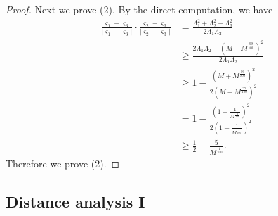 \documentclass[reqno]{amsart}
\theoremstyle{plain}
\theoremstyle{definition}
\numberwithin{equation}{section}
\newcommand{\1}{\mathbbm{1}}
\begin{document}
\begin{proof}
Next we prove (2). By the direct computation, we have
\begin{align*}
\frac{\varsigma_1-\varsigma_3}{|\varsigma_1-\varsigma_3|}\cdot \frac{\varsigma_2-\varsigma_3}{|\varsigma_2-\varsigma_3|}&=\frac{\Lambda_1^2+\Lambda_2^2-\Lambda_3^2}{2\Lambda_1\Lambda_2}
\\
&\geq \frac{2\Lambda_1\Lambda_2-(M+M^{\frac{99}{100}})^2}{2\Lambda_1\Lambda_2}
\\
&\geq 1-\frac{(M+M^{\frac{99}{100}})^2}{2(M-M^{\frac{99}{100}})^2}
\\
&= 1-\frac{(1+\frac{1}{M^{\frac{1}{100}}})^2}{2(1-\frac{1}{M^{\frac{1}{100}}})^2}
\\
&\geq \frac{1}{2}-\frac{5}{M^{\frac{1}{100}}}. 
\end{align*}
Therefore we prove (2).
\end{proof}




\subsection{Distance analysis I}
\end{document}
